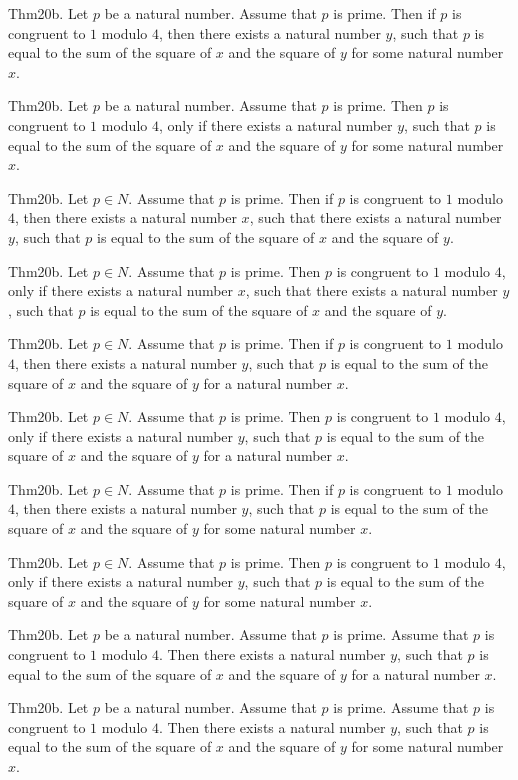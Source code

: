 \documentclass{article}
\begin{document}
Thm20b. Let $p$ be a natural number. Assume that $p$ is prime. Then if $p$ is congruent to $1$ modulo $4$, then there exists a natural number $y$, such that $p$ is equal to the sum of the square of $x$ and the square of $y$ for some natural number $x$.

Thm20b. Let $p$ be a natural number. Assume that $p$ is prime. Then $p$ is congruent to $1$ modulo $4$, only if there exists a natural number $y$, such that $p$ is equal to the sum of the square of $x$ and the square of $y$ for some natural number $x$.

Thm20b. Let $p \in N$. Assume that $p$ is prime. Then if $p$ is congruent to $1$ modulo $4$, then there exists a natural number $x$, such that there exists a natural number $y$, such that $p$ is equal to the sum of the square of $x$ and the square of $y$.

Thm20b. Let $p \in N$. Assume that $p$ is prime. Then $p$ is congruent to $1$ modulo $4$, only if there exists a natural number $x$, such that there exists a natural number $y$, such that $p$ is equal to the sum of the square of $x$ and the square of $y$.

Thm20b. Let $p \in N$. Assume that $p$ is prime. Then if $p$ is congruent to $1$ modulo $4$, then there exists a natural number $y$, such that $p$ is equal to the sum of the square of $x$ and the square of $y$ for a natural number $x$.

Thm20b. Let $p \in N$. Assume that $p$ is prime. Then $p$ is congruent to $1$ modulo $4$, only if there exists a natural number $y$, such that $p$ is equal to the sum of the square of $x$ and the square of $y$ for a natural number $x$.

Thm20b. Let $p \in N$. Assume that $p$ is prime. Then if $p$ is congruent to $1$ modulo $4$, then there exists a natural number $y$, such that $p$ is equal to the sum of the square of $x$ and the square of $y$ for some natural number $x$.

Thm20b. Let $p \in N$. Assume that $p$ is prime. Then $p$ is congruent to $1$ modulo $4$, only if there exists a natural number $y$, such that $p$ is equal to the sum of the square of $x$ and the square of $y$ for some natural number $x$.

Thm20b. Let $p$ be a natural number. Assume that $p$ is prime. Assume that $p$ is congruent to $1$ modulo $4$. Then there exists a natural number $y$, such that $p$ is equal to the sum of the square of $x$ and the square of $y$ for a natural number $x$.

Thm20b. Let $p$ be a natural number. Assume that $p$ is prime. Assume that $p$ is congruent to $1$ modulo $4$. Then there exists a natural number $y$, such that $p$ is equal to the sum of the square of $x$ and the square of $y$ for some natural number $x$.
\end{document}
